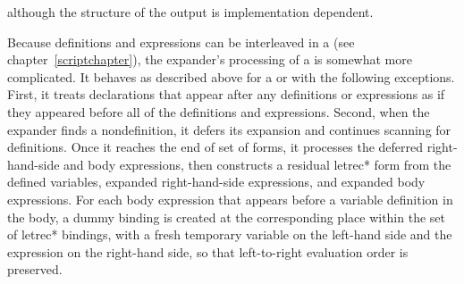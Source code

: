 although the structure of the output is implementation dependent.

Because definitions and expressions can be interleaved in a
 (see chapter~\ref{scriptchapter}),
the expander's processing of a  is somewhat
more complicated.
It behaves as described above for a  or
 with the following exceptions.
First, it treats declarations that appear after any definitions or
expressions as if they appeared before all of the definitions and
expressions.
Second, when the expander finds a nondefinition,
it defers its expansion and continues scanning for definitions.
Once it reaches the end of set of forms, it processes the
deferred right-hand-side and body expressions, then
constructs a residual {\cf letrec*} form from the defined variables,
expanded right-hand-side expressions, and expanded body expressions.
For each body expression that appears before a variable definition
in the body, a dummy binding is created at the corresponding place within
the set of {\cf letrec*} bindings, with a fresh temporary variable on the
left-hand side and the expression on the right-hand side, so that
left-to-right evaluation order is preserved.

